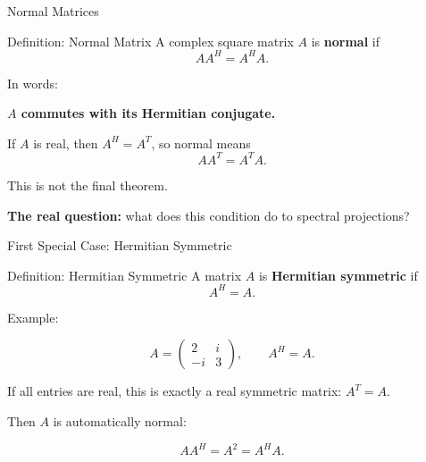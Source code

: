 \documentclass[10pt]{beamer}
\theoremstyle{definition}
\newcommand{\x}[1]{\alert{\textbf{#1}}}
\begin{document}
\begin{frame}{Normal Matrices}

\begin{block}{Definition: Normal Matrix}
A complex square matrix $A$ is \x{normal} if
$$
AA^H=A^HA.
$$
\end{block}

\vfill

In words:

\begin{center}
\x{$A$ commutes with its Hermitian conjugate.}
\end{center}

\vfill

If $A$ is real, then $A^H=A^T$, so normal means
$$
AA^T=A^TA.
$$

\vfill\pause

This is not the final theorem.

\vfill

\x{The real question:} what does this condition do to spectral projections?

\end{frame}


\begin{frame}{First Special Case: Hermitian Symmetric}

\begin{block}{Definition: Hermitian Symmetric}
A matrix $A$ is \x{Hermitian symmetric} if
$$
A^H=A.
$$
\end{block}

\vfill

Example:

$$
A=\begin{pmatrix}
2&i\\
-i&3
\end{pmatrix},
\qquad
A^H=A.
$$

If all entries are real, this is exactly a real symmetric matrix: $A^T=A$.

\vfill\pause

Then $A$ is automatically normal:

$$
AA^H=A^2=A^HA.
$$

\end{frame}
\end{document}
